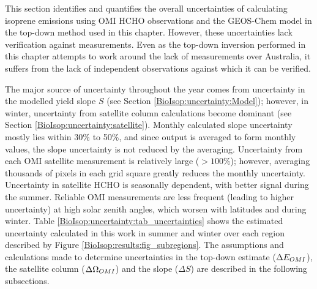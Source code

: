   
  This section identifies and quantifies the overall uncertainties of calculating isoprene emissions using OMI HCHO observations and the GEOS-Chem model in the top-down method used in this chapter.
  However, these uncertainties lack verification against measurements.
  Even as the top-down inversion performed in this chapter attempts to work around the lack of measurements over Australia, it suffers from the lack of independent observations against which it can be verified.
  
  The major source of uncertainty throughout the year comes from uncertainty in the modelled yield slope $S$ (see Section \ref{BioIsop:uncertainty:Model}); however, in winter, uncertainty from satellite column calculations become dominant (see Section \ref{BioIsop:uncertainty:satellite}).
  Monthly calculated slope uncertainty mostly lies within 30\% to 50\%, and since output is averaged to form monthly values, the slope uncertainty is not reduced by the averaging.
  Uncertainty from each OMI satellite measurement is relatively large ($>100\%$); however, averaging thousands of pixels in each grid square greatly reduces the monthly uncertainty.
  Uncertainty in satellite HCHO is seasonally dependent, with better signal during the summer.
  Reliable OMI measurements are less frequent (leading to higher uncertainty) at high solar zenith angles, which worsen with latitudes and during winter.
  Table \ref{BioIsop:uncertainty:tab_uncertainties} shows the estimated uncertainty calculated in this work in summer and winter over each region described by Figure \ref{BioIsop:results:fig_subregions}.
  The assumptions and calculations made to determine uncertainties in the top-down estimate ($\Delta E_{OMI}$), the satellite column ($\Delta \Omega_{OMI}$) and the slope ($\Delta S$) are described in the following subsections.
  
